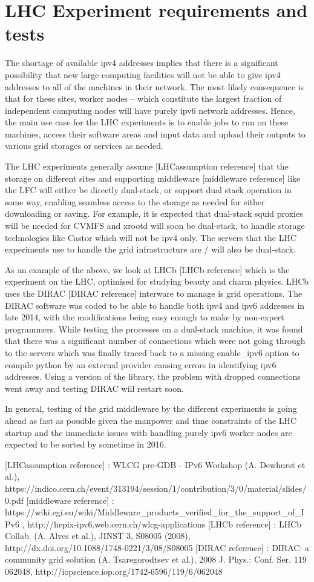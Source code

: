 \section{LHC Experiment requirements and tests}

The shortage of available ipv4 addresses implies that there is a significant possibility that new large
computing facilities will not be able to give ipv4 addresses to all of the machines in their network. The
most likely consequence is that for these sites, worker nodes -- which constitute the largest fraction of
independent computing nodes will have purely ipv6 network addresses. Hence, the main use case for the LHC
experiments is to enable jobs to run on these machines, access their software areas and input data and
upload their outputs to various grid storages or services as needed.

The LHC experiments generally assume [LHCassumption reference] that the storage on different sites and
supporting middleware [middleware reference] like the LFC will either be directly dual-stack, or support
dual stack operation in some way, enabling seamless access to the storage as needed for either downloading
or saving. For example, it is expected that dual-stack squid proxies will be needed for CVMFS and xrootd
will soon be dual-stack, to handle storage technologies like Castor which will not be ipv4 only. The
servers that the LHC experiments use to handle the grid infrastructure are / will also be dual-stack.

As an example of the above, we look at LHCb [LHCb reference] which is the experiment on the LHC, optimised
for studying beauty and charm physics. LHCb uses the DIRAC [DIRAC reference] interware to manage is grid
operations. The DIRAC software was coded to be able to handle both ipv4 and ipv6 addresses in late 2014,
with the modifications being easy enough to make by non-expert programmers. While testing the processes
on a dual-stack machine, it was found that there was a significant number of connections which were not
going through to the servers which was finally traced back to a missing enable_ipv6 option to compile python
by an external provider causing errors in identifying ipv6 addresses. Using a version of the library, the
problem with dropped connections went away and testing DIRAC will restart soon.

In general, testing of the grid middleware by the different experiments is going ahead as fast as possible
given the manpower and time constraints of the LHC startup and the immediate issues with handling purely
ipv6 worker nodes are expected to be sorted by sometime in 2016.

[LHCassumption reference] : WLCG pre-GDB - IPv6 Workshop (A. Dewhurst et al.), https://indico.cern.ch/event/313194/session/1/contribution/3/0/material/slides/0.pdf
[middleware reference] : https://wiki.egi.eu/wiki/Middleware_products_verified_for_the_support_of_IPv6 , http://hepix-ipv6.web.cern.ch/wlcg-applications
[LHCb reference] : LHCb Collab. (A. Alves et al.), JINST 3, S08005 (2008), http://dx.doi.org/10.1088/1748-0221/3/08/S08005
[DIRAC reference] : DIRAC: a community grid solution (A. Tsaregorodtsev et al.), 2008 J. Phys.: Conf. Ser. 119 062048, http://iopscience.iop.org/1742-6596/119/6/062048


